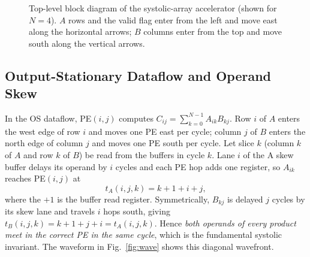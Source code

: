 \documentclass[conference]{IEEEtran}
\begin{document}
\begin{figure}[t]
\caption{Top-level block diagram of the systolic-array accelerator (shown for $N=4$). $A$ rows and the valid flag enter from the left and move east along the horizontal arrows; $B$ columns enter from the top and move south along the vertical arrows.}
\label{fig:block}
\end{figure}

\subsection{Output-Stationary Dataflow and Operand Skew}\label{sec:dataflow}
In the OS dataflow, PE$(i,j)$ computes
$C_{ij}=\sum_{k=0}^{N-1}A_{ik}B_{kj}$. Row $i$ of $A$ enters the west edge of
row $i$ and moves one PE east per cycle; column $j$ of $B$ enters the north
edge of column $j$ and moves one PE south per cycle. Let slice $k$ (column $k$
of $A$ and row $k$ of $B$) be read from the buffers in cycle $k$. Lane $i$ of
the A skew buffer delays its operand by $i$ cycles and each PE hop adds one
register, so $A_{ik}$ reaches PE$(i,j)$ at
\begin{equation}
t_A(i,j,k) = k + 1 + i + j ,\label{eq:skew}
\end{equation}
where the $+1$ is the buffer read register. Symmetrically, $B_{kj}$ is delayed
$j$ cycles by its skew lane and travels $i$ hops south, giving
$t_B(i,j,k)=k+1+j+i=t_A(i,j,k)$. Hence \emph{both operands of every product
meet in the correct PE in the same cycle}, which is the fundamental systolic
invariant. The waveform in Fig.~\ref{fig:wave} shows this diagonal wavefront.
\end{document}
